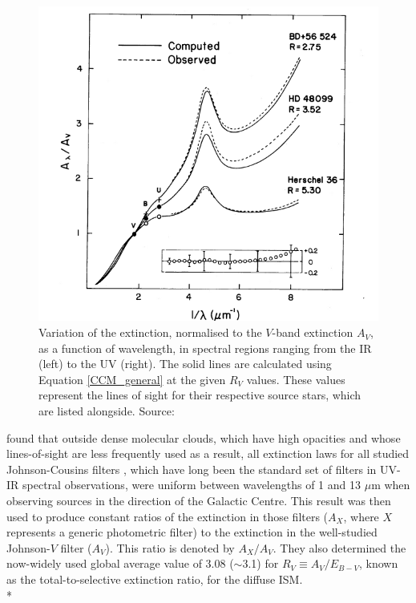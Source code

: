 \documentclass[12pt, a4paper]{report}
\begin{document}
\begin{figure}[h!]
\begin{center}
\includegraphics[width=1.0\textwidth]{cardelli_curve_fig4_crop.png}
\caption{Variation of the extinction, normalised to the $V$-band extinction $A_{V}$, as a function of wavelength, in spectral regions ranging from the IR (left) to the UV (right). The solid lines are calculated using Equation \ref{CCM_general} at the given $R_{V}$ values. These values represent the lines of sight for their respective source stars, which are listed alongside.  Source: \cite{1989ApJ...345..245C}}
\label{cardelli_curve}
\end{center}
\end{figure}

\cite{1985ApJ...288..618R} found that outside dense molecular clouds, which have high opacities and whose lines-of-sight are less frequently used as a result, all extinction laws for all studied Johnson-Cousins filters \citep{1953ApJ...117..313J}, which have long been the standard set of filters in UV-IR spectral observations, were uniform between wavelengths of 1 and 13 $\mu$m when observing sources in the direction of the Galactic Centre. This result was then used to produce constant ratios of the extinction in those filters ($A_{X}$, where $X$ represents a generic photometric filter) to the extinction in the well-studied Johnson-$V$ filter ($A_{V}$). This ratio is denoted by $A_{X}/A_{V}$. They also determined the now-widely used global average value of 3.08 ($\sim$3.1) for $R_{V} \equiv A_{V}/E_{B-V}$, known as the total-to-selective extinction ratio,  for the diffuse ISM. \\*
\end{document}
